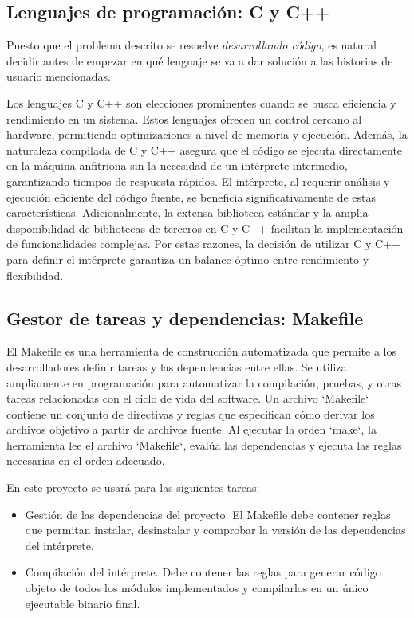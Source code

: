 \subsection{Lenguajes de programación: C y C++}
Puesto que el problema descrito se resuelve \textit{desarrollando código}, es natural decidir antes de empezar en qué lenguaje se va a dar solución a las historias de usuario mencionadas.

\vspace{0.5cm}
Los lenguajes C y C++ son elecciones prominentes cuando se busca eficiencia y rendimiento en un sistema. Estos lenguajes ofrecen un control cercano al hardware, permitiendo optimizaciones a nivel de memoria y ejecución. Además, la naturaleza compilada de C y C++ asegura que el código se ejecuta directamente en la máquina anfitriona sin la necesidad de un intérprete intermedio, garantizando tiempos de respuesta rápidos. El intérprete, al requerir análisis y ejecución eficiente del código fuente, se beneficia significativamente de estas características. Adicionalmente, la extensa biblioteca estándar y la amplia disponibilidad de bibliotecas de terceros en C y C++ facilitan la implementación de funcionalidades complejas. Por estas razones, la decisión de utilizar C y C++ para definir el intérprete garantiza un balance óptimo entre rendimiento y flexibilidad.

\subsection{Gestor de tareas y dependencias: Makefile}
El Makefile es una herramienta de construcción automatizada que permite a los desarrolladores definir tareas y las dependencias entre ellas. Se utiliza ampliamente en programación para automatizar la compilación, pruebas, y otras tareas relacionadas con el ciclo de vida del software. Un archivo `Makefile` contiene un conjunto de directivas y reglas que especifican cómo derivar los archivos objetivo a partir de archivos fuente. Al ejecutar la orden `make`, la herramienta lee el archivo `Makefile`, evalúa las dependencias y ejecuta las reglas necesarias en el orden adecuado.

\vspace{0.5cm}
\noindent
En este proyecto se usará para las siguientes tareas:
\begin{itemize}
    \item Gestión de las dependencias del proyecto. El Makefile debe contener reglas que permitan instalar, desinstalar y comprobar la versión de las dependencias del intérprete.
    \item Compilación del intérprete. Debe contener las reglas para generar código objeto de todos los módulos implementados y compilarlos en un único ejecutable binario final.
\end{itemize}

